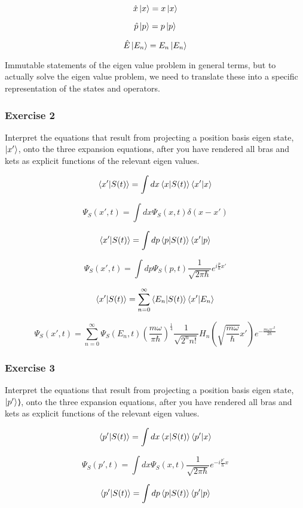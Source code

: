 \documentclass{article}
\begin{document}
$$\hat{x} \ket{x} = x \ket{x}$$

$$\hat{p} \ket{p} = p \ket{p}$$

$$\hat{E} \ket{E_n} = E_n \ket{E_n}$$

Immutable statements of the eigen value problem in general terms, but to actually solve the eigen value problem, we need to translate these into a specific representation of the states and operators. 

\subsubsection{Exercise 2}

Interpret the equations that result from projecting a position basis eigen state, $\ket{x'}$, onto the three expansion equations, after you have rendered all bras and kets as explicit functions of the relevant eigen values. 

$$\braket{x'|S(t)} = \int dx \braket{x|S(t)} \braket{x'|x}$$

$$\Psi_S(x',t) = \int dx \Psi_S (x,t) \delta(x- x')$$

$$\braket{x'|S(t)} = \int dp \braket{p|S(t)} \braket{x'|p}$$

$$\Psi_S(x',t) = \int dp \Psi_S(p,t) \frac{1}{\sqrt{2 \pi \hbar}} e^{i \frac{p}{\hbar} x'}$$

$$\braket{x'|S(t)} = \sum_{n=0}^\infty \braket{E_n|S(t)} \braket{x'|E_n}$$

$$\Psi_S(x',t) = \sum_{n=0}^\infty \Psi_S (E_n,t) \left( \frac{m \omega}{\pi \hbar} \right)^{\frac{1}{4}} \frac{1}{\sqrt{2^n n!}} H_n \left( \sqrt{\frac{m \omega}{\hbar}} x' \right) e^{- \frac{m \omega x'^2}{2 \hbar}}$$

\subsubsection{Exercise 3}

Interpret the equations that result from projecting a position basis eigen state, $\ket{p'}$⟩, onto the three expansion equations, after you have rendered all bras and kets as explicit functions of the relevant eigen values. 

$$\braket{p'|S(t)} = \int dx \braket{x|S(t)} \braket{p'|x}$$

$$\Psi_S(p',t) = \int dx \Psi_S(x,t) \frac{1}{\sqrt{2 \pi \hbar}} e^{-i \frac{p'}{\hbar} x}$$

$$\braket{p'|S(t)} = \int dp \braket{p|S(t)} \braket{p'|p}$$
\end{document}
